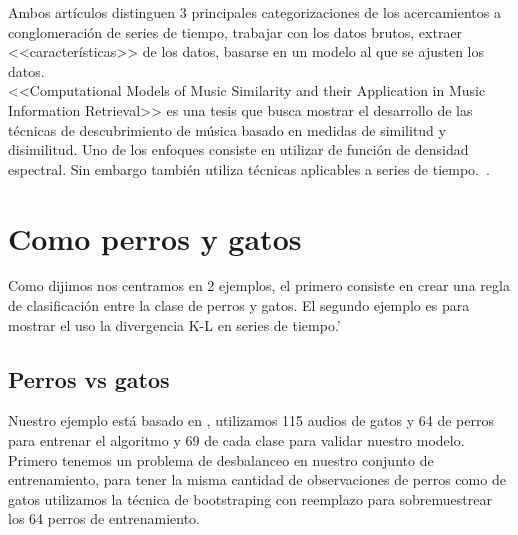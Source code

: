 \documentclass[twocolumn,10pt]{asme2ej}
\begin{document}
Ambos art\'iculos distinguen 3 principales categorizaciones de los acercamientos a conglomeraci\'on de series de tiempo, trabajar con los datos brutos, extraer <<caracter\'isticas>> de los datos, basarse en un modelo al que se ajusten los datos. \\

<<Computational Models of Music Similarity and their Application in Music Information Retrieval>> es una tesis que busca mostrar el desarrollo de las t\'ecnicas de descubrimiento de m\'usica basado en medidas de similitud y disimilitud. Uno de los enfoques consiste en utilizar de funci\'on de densidad espectral. Sin embargo tambi\'en utiliza t\'ecnicas aplicables a series de tiempo.~\cite{MUSIC}.

\section{Como perros y gatos} %
\label{sec:como_perros_y_gatos}
Como dijimos nos centramos en 2 ejemplos, el primero consiste en crear una regla de clasificaci\'on entre la clase de perros y gatos. El segundo ejemplo es para mostrar el uso la divergencia K-L en series de tiempo.'
\subsection{Perros vs gatos} %
\label{sub:perros_vs_gatos}
Nuestro ejemplo est\'a basado en \cite{DATOS2}, utilizamos 115 audios de gatos y 64 de perros para entrenar el algoritmo y 69 de cada clase para validar nuestro modelo.\\
Primero tenemos un problema de desbalanceo en nuestro conjunto de entrenamiento, para tener la misma cantidad de observaciones de perros como de gatos utilizamos la t\'ecnica de bootstraping con reemplazo para sobremuestrear los 64 perros de entrenamiento.\\
\end{document}
